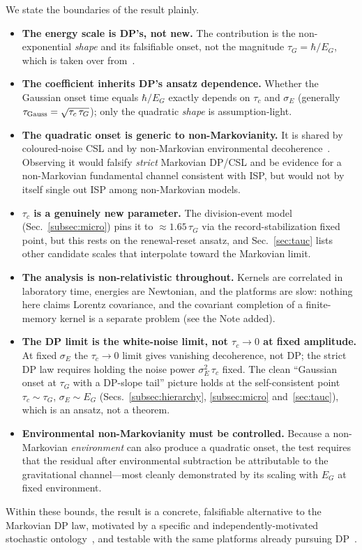\documentclass[aps,prd,onecolumn,amsmath,amssymb,nofootinbib,superscriptaddress]{revtex4-2}
\begin{document}
We state the boundaries of the result plainly.
\begin{itemize}
\item \textbf{The energy scale is DP's, not new.} The contribution is the non-exponential
\emph{shape} and its falsifiable onset, not the magnitude $\tau_G=\hbar/E_G$, which is taken over
from~\cite{R1,R2,R3}.
\item \textbf{The coefficient inherits DP's ansatz dependence.} Whether the Gaussian onset time
equals $\hbar/E_G$ exactly depends on $\tau_c$ and $\sigma_E$ (generally $\tau_{\rm
Gauss}=\sqrt{\tau_c\,\tau_G}$); only the quadratic \emph{shape} is assumption-light.
\item \textbf{The quadratic onset is generic to non-Markovianity.} It is shared by coloured-noise CSL
and by non-Markovian environmental decoherence~\cite{R10,R21,R22}. Observing it would falsify
\emph{strict} Markovian DP/CSL and be evidence for a non-Markovian fundamental channel consistent
with ISP, but would not by itself single out ISP among non-Markovian models.
\item \textbf{$\tau_c$ is a genuinely new parameter.} The division-event model
(Sec.~\ref{subsec:micro}) pins it to $\approx1.65\,\tau_G$ via the record-stabilization fixed point, but
this rests on the renewal-reset ansatz, and Sec.~\ref{sec:tauc} lists other candidate scales that
interpolate toward the Markovian limit.
\item \textbf{The analysis is non-relativistic throughout.}  Kernels are correlated in laboratory
time, energies are Newtonian, and the platforms are slow: nothing here claims Lorentz covariance,
and the covariant completion of a finite-memory kernel is a separate problem (see the Note added).
\item \textbf{The DP limit is the white-noise limit, not $\tau_c\to0$ at fixed amplitude.} At fixed
$\sigma_E$ the $\tau_c\to0$ limit gives vanishing decoherence, not DP; the strict DP law requires
holding the noise power $\sigma_E^2\,\tau_c$ fixed. The clean ``Gaussian onset at $\tau_G$ with a
DP-slope tail'' picture holds at the self-consistent point $\tau_c\sim\tau_G$, $\sigma_E\sim E_G$
(Secs.~\ref{subsec:hierarchy}, \ref{subsec:micro} and~\ref{sec:tauc}), which is an ansatz, not a theorem.
\item \textbf{Environmental non-Markovianity must be controlled.} Because a non-Markovian
\emph{environment} can also produce a quadratic onset, the test requires that the residual after
environmental subtraction be attributable to the gravitational channel---most cleanly demonstrated by
its scaling with $E_G$ at fixed environment.
\end{itemize}
Within these bounds, the result is a concrete, falsifiable alternative to the Markovian DP law,
motivated by a specific and independently-motivated stochastic ontology~\cite{R11,R12}, and testable
with the same platforms already pursuing DP~\cite{R16,R17,R19,R23}.
\end{document}
